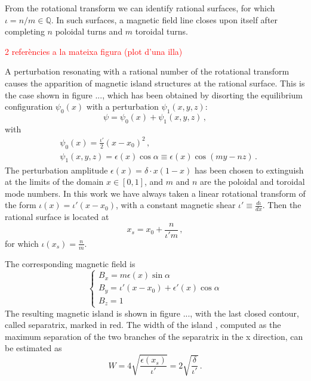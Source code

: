 From the rotational transform we can identify rational surfaces, for which $\iota=n/m\in\mathbb{Q}$. In such surfaces, a magnetic field line closes upon itself after completing $n$ poloidal turns and $m$ toroidal turns.

\textcolor{red}{2 referències a la mateixa figura (plot d'una illa)}

A perturbation resonating with a rational number of the rotational transform causes the apparition of magnetic island structures at the rational surface. This is the case shown in figure ..., which has been obtained by disorting the equilibrium configuration $\psi_0(x)$ with a perturbation $\psi_1(x,y,z)$:
\begin{equation}
	\psi=\psi_0(x)+\psi_1(x,y,z)\,,
\end{equation}
with
\begin{align}
	&\psi_0(x)=\frac{\iota'}{2}(x-x_0)^2\,,\\
	&\psi_1(x,y,z)=\epsilon(x)\cos\alpha\equiv\epsilon(x)\cos(my-nz)\,.
\end{align}
The perturbation amplitude $\epsilon(x)=\delta\cdot x(1-x)$ has been chosen to extinguish at the limits of the domain $x\in[0,1]$, and $m$ and $n$ are the poloidal and toroidal mode numbers. In this work we have always taken a linear rotational transform of the form $\iota(x)=\iota'(x-x_0)$, with a constant magnetic shear $\iota'\equiv\frac{d\iota}{dx}$. Then the rational surface is located at
\begin{equation}\label{x_s}
x_s=x_0+\frac{n}{\iota'm}\,,
\end{equation}
for which $\iota(x_s)=\frac{n}{m}$.

The corresponding magnetic field is
\begin{equation}\label{B_one_pert}
\begin{cases}
	B_x = m\epsilon(x)\sin\alpha\\
	B_y = \iota'(x-x_0) + \epsilon'(x)\cos\alpha\\
	B_z = 1
\end{cases} 
\end{equation}
The resulting magnetic island is shown in figure ..., with the last closed contour, called separatrix, marked in red. The width of the island \cite{}, computed as the maximum separation of the two branches of the separatrix in the x direction, can be estimated as 
\begin{equation}\label{W}
	W=4\sqrt{\frac{\epsilon(x_s)}{\iota'}}=2\sqrt{\frac{\delta}{\iota'}}\,.
\end{equation}

